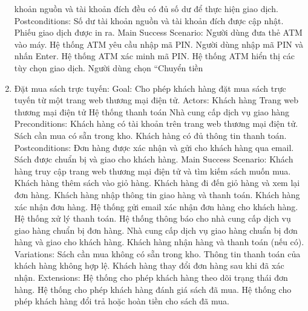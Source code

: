 \documentclass[
]{article}
\begin{document}
\begin{enumerate}
  khoản nguồn và tài khoản đích đều có đủ số dư để thực hiện giao dịch.
  Postconditions: Số dư tài khoản nguồn và tài khoản đích được cập nhật.
  Phiếu giao dịch được in ra. Main Success Scenario: Người dùng đưa thẻ
  ATM vào máy. Hệ thống ATM yêu cầu nhập mã PIN. Người dùng nhập mã PIN
  và nhấn Enter. Hệ thống ATM xác minh mã PIN. Hệ thống ATM hiển thị các
  tùy chọn giao dịch. Người dùng chọn ``Chuyển tiền
\item
  Đặt mua sách trực tuyến: Goal: Cho phép khách hàng đặt mua sách trực
  tuyến từ một trang web thương mại điện tử. Actors: Khách hàng Trang
  web thương mại điện tử Hệ thống thanh toán Nhà cung cấp dịch vụ giao
  hàng Preconditions: Khách hàng có tài khoản trên trang web thương mại
  điện tử. Sách cần mua có sẵn trong kho. Khách hàng có đủ thông tin
  thanh toán. Postconditions: Đơn hàng được xác nhận và gửi cho khách
  hàng qua email. Sách được chuẩn bị và giao cho khách hàng. Main
  Success Scenario: Khách hàng truy cập trang web thương mại điện tử và
  tìm kiếm sách muốn mua. Khách hàng thêm sách vào giỏ hàng. Khách hàng
  đi đến giỏ hàng và xem lại đơn hàng. Khách hàng nhập thông tin giao
  hàng và thanh toán. Khách hàng xác nhận đơn hàng. Hệ thống gửi email
  xác nhận đơn hàng cho khách hàng. Hệ thống xử lý thanh toán. Hệ thống
  thông báo cho nhà cung cấp dịch vụ giao hàng chuẩn bị đơn hàng. Nhà
  cung cấp dịch vụ giao hàng chuẩn bị đơn hàng và giao cho khách hàng.
  Khách hàng nhận hàng và thanh toán (nếu có). Variations: Sách cần mua
  không có sẵn trong kho. Thông tin thanh toán của khách hàng không hợp
  lệ. Khách hàng thay đổi đơn hàng sau khi đã xác nhận. Extensions: Hệ
  thống cho phép khách hàng theo dõi trạng thái đơn hàng. Hệ thống cho
  phép khách hàng đánh giá sách đã mua. Hệ thống cho phép khách hàng đổi
  trả hoặc hoàn tiền cho sách đã mua.
\end{enumerate}
\end{document}
